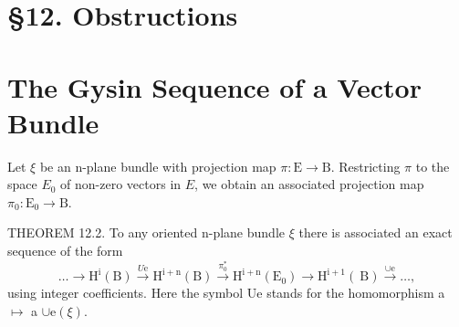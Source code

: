 \documentclass[10pt]{article}
\begin{document}
\section{§12. Obstructions}


\section{The Gysin Sequence of a Vector Bundle}
Let $\xi$ be an n-plane bundle with projection map $\pi: \mathrm{E} \rightarrow \mathrm{B}$. Restricting $\pi$ to the space $E_{0}$ of non-zero vectors in $E$, we obtain an associated projection map $\pi_{0}: \mathrm{E}_{0} \rightarrow \mathrm{B}$.

THEOREM 12.2. To any oriented n-plane bundle $\xi$ there is associated an exact sequence of the form
$$
\ldots \longrightarrow \mathrm{H}^{\mathrm{i}}(\mathrm{B}) \stackrel{U \mathrm{e}}{\longrightarrow} \mathrm{H}^{\mathrm{i}+\mathrm{n}}(\mathrm{B}) \stackrel{\pi_{0}^{*}}{\longrightarrow} \mathrm{H}^{\mathrm{i}+\mathrm{n}}\left(\mathrm{E}_{0}\right) \longrightarrow \mathrm{H}^{\mathrm{i}+1}(\mathrm{~B}) \stackrel{\cup \mathrm{e}}{\longrightarrow} \ldots,
$$
using integer coefficients. Here the symbol Ue stands for the homomorphism a $\mapsto$ a $\cup \mathrm{e}(\xi)$.
\end{document}
